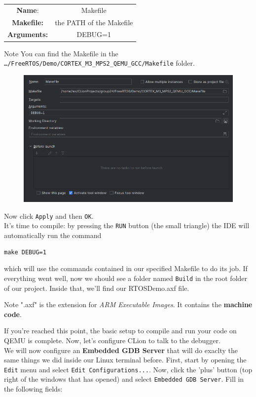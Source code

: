 \documentclass[10pt]{article}
\begin{document}
\begin{center}
\begin{tabular}{ c c }
 \textbf{Name}: & Makefile  \\ 
 \textbf{Makefile:} & the PATH of the Makefile \\  
 \textbf{Arguments:} & DEBUG=1   
\end{tabular}
\end{center}

\begin{example}{Note}
    You can find the Makefile in the \verb|…/FreeRTOS/Demo/CORTEX_M3_MPS2_QEMU_GCC/Makefile| folder.
\end{example}

\begin{figure}[H]
    \centering
    \includegraphics[width=0.7\linewidth]{Pictures/3.png}
    \caption{}
    \label{fig:2}
\end{figure}

Now click \verb|Apply| and then \verb|OK|.\\

It's time to compile: by pressing the \verb|RUN| button (the small triangle) the IDE will automatically run the command
\begin{lstlisting}
make DEBUG=1
\end{lstlisting}
which will use the commands contained in our specified Makefile to do its job. If everything went well, now we should see a folder named \verb|Build| in the root folder of our project. Inside that, we'll find our RTOSDemo.axf file.
\begin{example}{Note}
".axf" is the extension for \textit{ARM Executable Images}. It contains the \textbf{machine code}.
\end{example}
If you're reached this point, the basic setup to compile and run your code on QEMU is complete. Now, let's configure CLion to talk to the debugger.\\
We will now configure an \textbf{Embedded GDB Server} that will do exaclty the same things we did inside our Linux terminal before. First, start by opening the \verb|Edit| menu and select \verb|Edit Configurations...|. Now, click the 'plus' button (top right of the windows that has opened) and select \verb|Embedded GDB Server|. Fill in the following fields:
\end{document}
